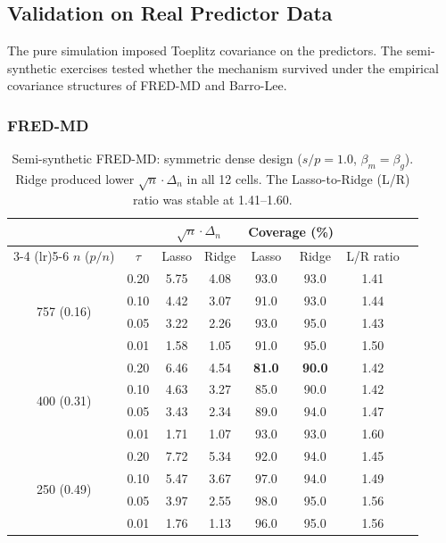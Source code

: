 \documentclass[a4paper,10.5pt]{article}
\begin{document}
\subsection{Validation on Real Predictor Data}\label{sec:validation}

The pure simulation imposed Toeplitz covariance on the predictors. The semi-synthetic exercises tested whether the mechanism survived under the empirical covariance structures of FRED-MD and Barro-Lee.

\subsubsection*{FRED-MD}

\begin{table}[H]
\centering
\small
\caption{Semi-synthetic FRED-MD: symmetric dense design ($s/p = 1.0$, $\beta_m = \beta_g$). Ridge produced lower $\sqrt{n}\cdot\Delta_n$ in all 12 cells. The Lasso-to-Ridge (L/R) ratio was stable at 1.41--1.60.}
\label{tab:fredmd}
\begin{tabular}{cccccccc}
\toprule
& & \multicolumn{2}{c}{$\sqrt{n}\cdot\Delta_n$} & \multicolumn{2}{c}{Coverage (\%)} & \\
\cmidrule(lr){3-4} \cmidrule(lr){5-6}
$n$ ($p/n$) & $\tau$ & Lasso & Ridge & Lasso & Ridge & L/R ratio \\
\midrule
\multirow{4}{*}{757 (0.16)}
 & 0.20 & 5.75 & 4.08 & 93.0 & 93.0 & 1.41 \\
 & 0.10 & 4.42 & 3.07 & 91.0 & 93.0 & 1.44 \\
 & 0.05 & 3.22 & 2.26 & 93.0 & 95.0 & 1.43 \\
 & 0.01 & 1.58 & 1.05 & 91.0 & 95.0 & 1.50 \\
\midrule
\multirow{4}{*}{400 (0.31)}
 & 0.20 & 6.46 & 4.54 & \textbf{81.0} & \textbf{90.0} & 1.42 \\
 & 0.10 & 4.63 & 3.27 & 85.0 & 90.0 & 1.42 \\
 & 0.05 & 3.43 & 2.34 & 89.0 & 94.0 & 1.47 \\
 & 0.01 & 1.71 & 1.07 & 93.0 & 93.0 & 1.60 \\
\midrule
\multirow{4}{*}{250 (0.49)}
 & 0.20 & 7.72 & 5.34 & 92.0 & 94.0 & 1.45 \\
 & 0.10 & 5.47 & 3.67 & 97.0 & 94.0 & 1.49 \\
 & 0.05 & 3.97 & 2.55 & 98.0 & 95.0 & 1.56 \\
 & 0.01 & 1.76 & 1.13 & 96.0 & 95.0 & 1.56 \\
\bottomrule
\end{tabular}
\end{table}
\end{document}
